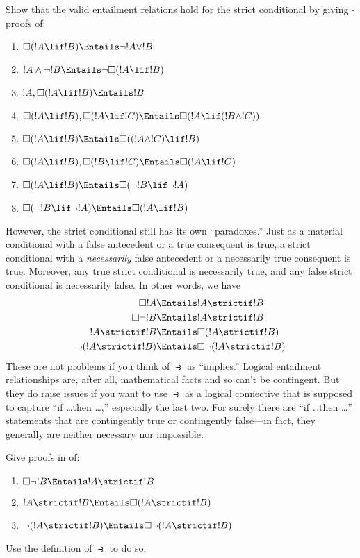\documentclass[../../../include/open-logic-section]{subfiles}
\begin{document}
\begin{prob}
  Show that the valid entailment relations hold for the strict
  conditional by giving -proofs of:
  \begin{enumerate}
  \item  $\Box(!A \lif !B) \Entails \lnot !A \lor !B$
  \item $!A \land \lnot !B \Entails \lnot\Box(!A \lif !B)$
  \item $!A, \Box(!A \lif !B) \Entails !B$
  \item $\Box(!A \lif !B), \Box(!A \lif !C) \Entails \Box(!A \lif (!B
    \land !C))$
  \item $\Box(!A \lif !B) \Entails \Box((!A \land !C) \lif !B)$
  \item $\Box(!A \lif !B), \Box(!B \lif !C) \Entails \Box(!A
    \lif !C)$
  \item $\Box(!A \lif !B) \Entails \Box(\lnot !B \lif \lnot !A)$
  \item $\Box(\lnot !B \lif \lnot !A) \Entails \Box(!A \lif !B)$
  \end{enumerate}
  \end{prob}

However, the strict conditional still has its own ``paradoxes.'' Just
as a material conditional with a false antecedent or a true consequent
is true, a strict conditional with a \emph{necessarily} false
antecedent or a necessarily true consequent is true. Moreover, any
true strict conditional is necessarily true, and any false strict
conditional is necessarily false. In other words, we have
\begin{align}
  \Box !A & \Entails !A \strictif !B\\
  \Box \lnot !B & \Entails !A \strictif !B\\
  !A \strictif !B& \Entails \Box(!A \strictif !B)\\
  \lnot(!A \strictif !B) & \Entails \Box\lnot(!A \strictif !B)
\end{align}
These are not problems if you think of $\strictif$ as ``implies.''
Logical entailment relationships are, after all, mathematical facts and so
can't be contingent. But they do raise issues if you want to use
$\strictif$ as a logical connective that is supposed to capture ``if
\dots then \dots,'' especially the last two. For surely there are ``if
\dots then \dots'' statements that are contingently true or
contingently false---in fact, they generally are neither necessary nor
impossible.

\begin{prob}
  Give proofs in  of:
  \begin{enumerate}
    \item  $\Box \lnot !B \Entails !A \strictif !B$
    \item $!A \strictif !B \Entails \Box(!A \strictif !B)$
    \item $\lnot(!A \strictif !B)  \Entails \Box\lnot(!A \strictif !B)$
  \end{enumerate}
  Use the definition of $\strictif$ to do so.
\end{prob}
\end{document}
